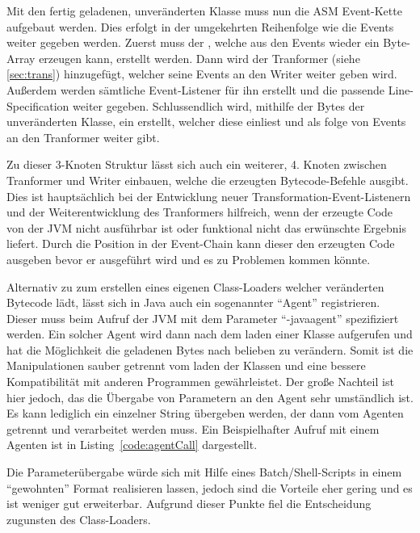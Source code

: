 Mit den fertig geladenen, unveränderten Klasse muss nun die ASM Event-Kette aufgebaut werden. Dies erfolgt in der umgekehrten Reihenfolge wie die Events weiter gegeben werden. Zuerst muss der , welche aus den Events wieder ein Byte-Array erzeugen kann, erstellt werden. Dann wird der Tranformer (siehe \ref{sec:trans}) hinzugefügt, welcher seine Events an den Writer weiter geben wird. Außerdem werden sämtliche Event-Listener für ihn erstellt und die passende Line-Specification weiter gegeben. Schlussendlich wird, mithilfe der Bytes der unveränderten Klasse, ein  erstellt, welcher diese einliest und als folge von Events an den Tranformer weiter gibt.

Zu dieser 3-Knoten Struktur lässt sich auch ein weiterer, 4. Knoten zwischen Tranformer und Writer einbauen, welche die erzeugten Bytecode-Befehle ausgibt. Dies ist hauptsächlich bei der Entwicklung neuer Transformation-Event-Listenern und der Weiterentwicklung des Tranformers hilfreich, wenn der erzeugte Code von der \ac{JVM} nicht ausführbar ist oder funktional nicht das erwünschte Ergebnis liefert. Durch die Position in der Event-Chain kann dieser den erzeugten Code ausgeben bevor er ausgeführt wird und es zu Problemen kommen könnte.

Alternativ zu zum erstellen eines eigenen Class-Loaders welcher veränderten Bytecode lädt, lässt sich in Java auch ein sogenannter "`Agent"' registrieren. Dieser muss beim Aufruf der \ac{JVM} mit dem Parameter "`-javaagent"' spezifiziert werden. Ein solcher Agent wird dann nach dem laden einer Klasse aufgerufen und hat die Möglichkeit die geladenen Bytes nach belieben zu verändern. Somit ist die Manipulationen sauber getrennt vom laden der Klassen und eine bessere Kompatibilität mit anderen Programmen gewährleistet. Der große Nachteil ist hier jedoch, das die Übergabe von Parametern an den Agent sehr umständlich ist. Es kann lediglich ein einzelner String übergeben werden, der dann vom Agenten getrennt und verarbeitet werden muss. \cite{agent_arg_stack} Ein Beispielhafter Aufruf mit einem Agenten ist in Listing~\ref{code:agentCall} dargestellt.

 

Die Parameterübergabe würde sich mit Hilfe eines Batch/Shell-Scripts in einem "`gewohnten"' Format realisieren lassen, jedoch sind die Vorteile eher gering und es ist weniger gut erweiterbar. Aufgrund dieser Punkte fiel die Entscheidung zugunsten des Class-Loaders.

